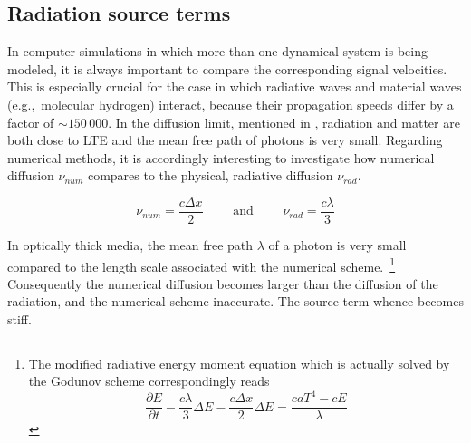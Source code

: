\subsection{Radiation source terms}
\label{subsec:Radiation_source}

In computer simulations in which more than one dynamical system is being modeled, it is always important to compare the corresponding signal velocities.
This is especially crucial for the case in which radiative waves and material waves (e.g.,~molecular hydrogen) interact, because their propagation speeds differ by a factor of $\sim 150\,000$.
In the diffusion limit, mentioned in , radiation and matter are both close to LTE and the mean free path of photons is very small.
Regarding numerical methods, it is accordingly interesting to investigate how numerical diffusion $\nu_{num}$ compares to the physical, radiative diffusion $\nu_{rad}$.

\begin{equation}
  \nu_{num} = \frac{c\Delta x}{2} \qquad\text{ and }\qquad \nu_{rad} = \frac{c\lambda}{3}
\end{equation}

In optically thick media, the mean free path $\lambda$ of a photon is very small compared to the length scale associated with the numerical scheme.~\footnote{The modified radiative energy moment equation which is actually solved by the Godunov scheme correspondingly reads
\begin{equation}
  \frac{\partial E}{\partial t} - \frac{c\lambda}{3}\Delta E - \frac{c\Delta x}{2}\Delta E = \frac{caT^{4} - cE}{\lambda}
\end{equation}
}
Consequently the numerical diffusion becomes larger than the diffusion of the radiation, and the numerical scheme inaccurate.
The source term whence becomes stiff.

